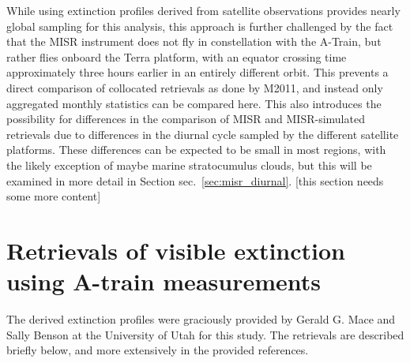 While using extinction profiles derived from satellite observations
provides nearly global sampling for this analysis, this approach is
further challenged by the fact that the MISR instrument does not fly in
constellation with the A-Train, but rather flies onboard the Terra
platform, with an equator crossing time approximately three hours
earlier in an entirely different orbit. This prevents a direct
comparison of collocated retrievals as done by M2011, and instead only
aggregated monthly statistics can be compared here. This also introduces
the possibility for differences in the comparison of MISR and
MISR-simulated retrievals due to differences in the diurnal cycle
sampled by the different satellite platforms. These differences can be
expected to be small in most regions, with the likely exception of maybe
marine stratocumulus clouds, but this will be examined in more detail in
Section sec.~\ref{sec:misr_diurnal}. {[}this section needs some more
content{]}

\section{Retrievals of visible extinction using A-train
measurements}\label{sec:ccux5fretrievals}

The derived extinction profiles were graciously provided by Gerald G.
Mace and Sally Benson at the University of Utah for this study. The
retrievals are described briefly below, and more extensively in the
provided references.


